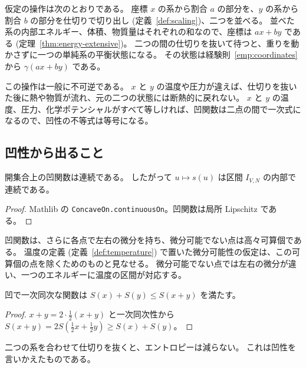 仮定の操作は次のとおりである。
座標 $x$ の系から割合 $a$ の部分を、$y$ の系から割合 $b$ の部分を仕切りで切り出し (定義~\ref{def:scaling})、二つを並べる。
並べた系の内部エネルギー、体積、物質量はそれぞれの和なので、座標は $ax + by$ である (定理~\ref{thm:energy-extensive})。
二つの間の仕切りを抜いて待つと、重りを動かさずに一つの単純系の平衡状態になる。
その状態は経験則~\ref{emp:coordinates} から $\gamma(ax + by)$ である。

この操作は一般に不可逆である。
$x$ と $y$ の温度や圧力が違えば、仕切りを抜いた後に熱や物質が流れ、元の二つの状態には断熱的に戻れない。
$x$ と $y$ の温度、圧力、化学ポテンシャルがすべて等しければ、凹関数は二点の間で一次式になるので、凹性の不等式は等号になる。

\subsection{凹性から出ること}

\begin{theorem}[エントロピーは連続]
  \label{thm:entropy-continuous}
  \leanok
  開集合上の凹関数は連続である。
  したがって $u \mapsto s(u)$ は区間 $I_{V,N}$ の内部で連続である。
\end{theorem}

\begin{proof}
  \leanok
  Mathlib の \texttt{ConcaveOn.continuousOn}。凹関数は局所 Lipschitz である。
\end{proof}

凹関数は、さらに各点で左右の微分を持ち、微分可能でない点は高々可算個である。
温度の定義 (定義~\ref{def:temperature}) で置いた微分可能性の仮定は、この可算個の点を除くためのものと見なせる。
微分可能でない点では左右の微分が違い、一つのエネルギーに温度の区間が対応する。

\begin{theorem}[優加法性]
  \label{thm:superadditive}
  \leanok
  凹で一次同次な関数は $S(x) + S(y) \le S(x + y)$ を満たす。
\end{theorem}

\begin{proof}
  \leanok
  $x + y = 2 \cdot \tfrac12 (x + y)$ と一次同次性から $S(x + y) = 2 S(\tfrac12 x + \tfrac12 y) \ge S(x) + S(y)$。
\end{proof}

二つの系を合わせて仕切りを抜くと、エントロピーは減らない。
これは凹性を言いかえたものである。

